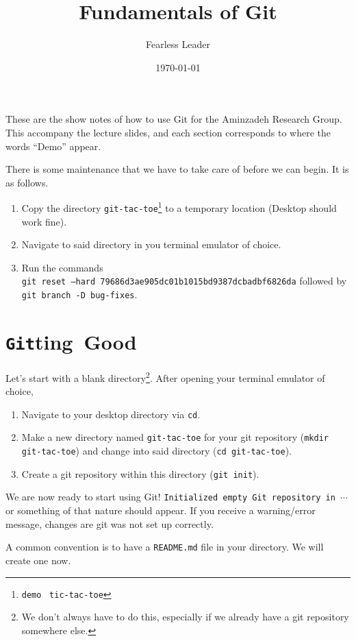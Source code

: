 \documentclass[12pt]{article}
\title{Fundamentals of Git}
\date{\today}
\author{Fearless Leader}
\newcommand{\shellcmd}[1]{\texttt{\colorbox{gray!30}{#1}}}
\begin{document}
\maketitle

These are the show notes of how to use Git for the Aminzadeh Research Group. This accompany the lecture slides, and each section corresponds to where the words ``Demo'' appear.

There is some maintenance that we have to take care of before we can begin. It is as follows.

\begin{enumerate}
    \item Copy the directory \texttt{git-tac-toe}\footnote{\texttt{demo} \textrightarrow \ \texttt{tic-tac-toe}} to a temporary location (Desktop should work fine).
    \item Navigate to said directory in you terminal emulator of choice.
    \item Run the commands \\ \shellcmd{git reset --hard 79686d3ae905dc01b1015bd9387dcbadbf6826da} followed by \shellcmd{git branch -D bug-fixes}. 
\end{enumerate}

\section{\texorpdfstring{\shellcmd{Git}ting} \ \ Good}
Let's start with a blank directory\footnote{We don't always have to do this, especially if we already have a git repository somewhere else.}. After opening your terminal emulator of choice,

\begin{enumerate}
    \item Navigate to your desktop directory via \shellcmd{cd}.
    \item Make a new directory named \texttt{git-tac-toe} for your git repository (\shellcmd{mkdir git-tac-toe}) and change into said directory (\shellcmd{cd git-tac-toe}).
    \item Create a git repository within this directory (\shellcmd{git init}).
\end{enumerate}

\noindent We are now ready to start using Git! \texttt{Initialized empty Git repository in $\cdots$} or something of that nature should appear. If you receive a warning/error message, changes are git was not set up correctly.

A common convention is to have a \texttt{README.md} file in your directory. We will create one now.
\end{document}
